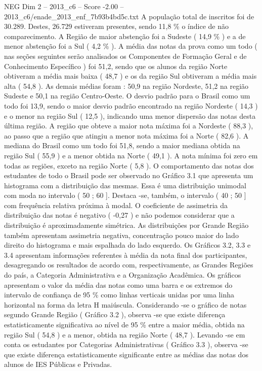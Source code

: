 \begin{textsample}{NEG Dim 2 – 2013\_c6 – Score -2.00 – 2013\_c6/enade\_2013\_enf\_7b93b4bd5c.txt}
A população total de inscritos foi de 30.289.
Destes, 26.729 estiveram presentes, sendo 11,8 \% o índice de não comparecimento.
A Região de maior abstenção foi a Sudeste ( 14,9 \% ) e a de menor abstenção foi a Sul ( 4,2 \% ).
A média das notas da prova como um todo ( nas seções seguintes serão analisados os Componentes de Formação Geral e de Conhecimento Específico ) foi 51,2, sendo que os alunos da região Norte obtiveram a média mais baixa ( 48,7 ) e os da região Sul obtiveram a média mais alta ( 54,8 ).
As demais médias foram : 50,9 na região Nordeste, 51,2 na região Sudeste e 50,1 na região Centro-Oeste.
O desvio padrão para o Brasil como um todo foi 13,9, sendo o maior desvio padrão encontrado na região Nordeste ( 14,3 ) e o menor na região Sul ( 12,5 ), indicando uma menor dispersão das notas desta última região.
A região que obteve a maior nota máxima foi a Nordeste ( 88,3 ), ao passo que a região que atingiu a menor nota máxima foi a Norte ( 82,6 ).
A mediana do Brasil como um todo foi 51,8, sendo a maior mediana obtida na região Sul ( 55,9 ) e a menor obtida na Norte ( 49,1 ).
A nota mínima foi zero em todas as regiões, exceto na região Norte ( 5,8 ).
O comportamento das notas dos estudantes de todo o Brasil pode ser observado no Gráfico 3.1 que apresenta um histograma com a distribuição das mesmas.
Essa é uma distribuição unimodal com moda no intervalo ( 50 ; 60 ].
Destaca -se, também, o intervalo ( 40 ; 50 ] com frequência relativa próxima à modal.
O coeficiente de assimetria da distribuição das notas é negativo ( -0,27 ) e não podemos considerar que a distribuição é aproximadamente simétrica.
As distribuições por Grande Região também apresentam assimetria negativa, concentração pouco maior do lado direito do histograma e mais espalhada do lado esquerdo.
Os Gráficos 3.2, 3.3 e 3.4 apresentam informações referentes à média da nota final dos participantes, desagregando os resultados de acordo com, respectivamente, as Grandes Regiões do país, a Categoria Administrativa e a Organização Acadêmica.
Os gráficos apresentam o valor da média das notas como uma barra e os extremos do intervalo de confiança de 95 \% como linhas verticais unidas por uma linha horizontal na forma da letra H maiúscula.
Considerando -se o gráfico de notas segundo Grande Região ( Gráfico 3.2 ), observa -se que existe diferença estatisticamente significativa ao nível de 95 \% entre a maior média, obtida na região Sul ( 54,8 ) e a menor, obtida na região Norte ( 48,7 ).
Levando -se em conta os estudantes por Categorias Administrativas ( Gráfico 3.3 ), observa -se que existe diferença estatisticamente significante entre as médias das notas dos alunos de IES Públicas e Privadas.

\end{textsample}

